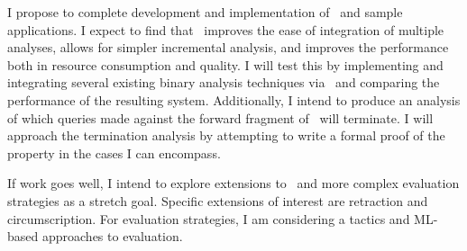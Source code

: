 I propose to complete development and implementation of \sysname\ and sample applications.
I expect to find that \sysname\ improves the ease of integration of multiple analyses, allows for simpler incremental analysis, and improves the performance both in resource consumption and quality.
I will test this by implementing and integrating several existing binary analysis techniques via \sysname\ and comparing the performance of the resulting system.
Additionally, I intend to produce an analysis of which queries made against the forward fragment of \sysname\ will terminate.
I will approach the termination analysis by attempting to write a formal proof of the property in the cases I can encompass.

If work goes well, I intend to explore extensions to \sysname\ and more complex evaluation strategies as a stretch goal.
Specific extensions of interest are retraction and circumscription.
For evaluation strategies, I am considering a tactics and ML-based approaches to evaluation.
